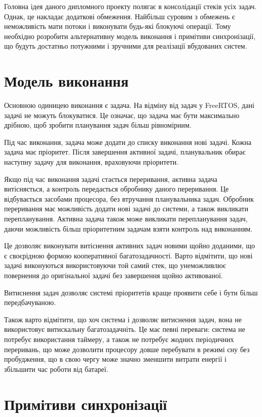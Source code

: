 \documentclass[oneside,14pt,a4paper,final]{myextreport}
\begin{document}
Головна ідея даного дипломного проекту полягає в консолідації стеків усіх задач. Однак, це накладає додаткові обмеження. Найбільш суровим з обмежень є неможливість мати потоки і виконувати будь-які блокуючі операції. Тому необхідно розробити альтернативну модель виконання і примітиви синхронізації, що будуть достатньо потужними і зручними для реалізації вбудованих систем.

\section{Модель виконання}

Основною одиницею виконання є задача. На відміну від задач у FreeRTOS, дані задачі не можуть блокуватися. Це означає, що задача має бути максимально дрібною, щоб зробити планування задач більш рівномірним.

Під час виконання, задача може додати до списку виконання нові задачі. Кожна задача має пріоритет. Після завершення активної задачі, планувальник обирає наступну задачу для виконання, враховуючи пріоритети.

Якщо під час виконання задачі стається переривання, активна задача витісняється, а контроль передається обробнику даного переривання. Це відбувається засобами процесора, без втручання планувальника задач. Обробник переривання має можливість додати нові задачі до системи, а також викликати перепланування. Активна задача також може викликати перепланування задач, даючи можливість більш пріоритетним задачам взяти контроль над виконанням.

Це дозволяє виконувати витіснення активних задач новими щойно доданими, що є своєрідною формою кооперативної багатозадачності. Варто відмітити, що нові задачі виконуються використовуючи той самий стек, що унеможливлює повернення до оригінальної задачі без завершення щойно активованої.

Витиснення задач дозволяє системі пріоритетів краще проявити себе і бути більш передбачуваною.

Також варто відмітити, що хоч система і дозволяє витиснення задач, вона не використовує витискальну багатозадачніть. Це має певні переваги: система не потребує використання таймеру, а також не потребує жодних періодичних переривань, що може дозволити процесору довше перебувати в режимі сну без пробудження, що в свою чергу може значно зменшити витрати енергії і збільшити час роботи від батареї.

\section{Примітиви синхронізації}
\end{document}
